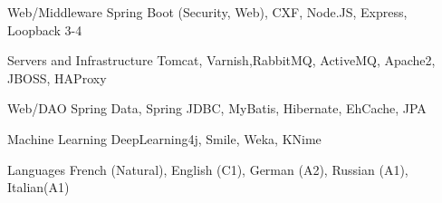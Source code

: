 \begin{cvskills}
  \cvskill
  {Web/Middleware} %
  {Spring Boot (Security, Web), CXF, Node.JS, Express, Loopback 3-4} %

  \cvskill
  {Servers and Infrastructure} %
  {Tomcat, Varnish,RabbitMQ, ActiveMQ, Apache2, JBOSS, HAProxy} %

  
  \cvskill
  {Web/DAO} %
  {Spring Data, Spring JDBC, MyBatis, Hibernate, EhCache, JPA} %

  \cvskill
  {Machine Learning} %
  {DeepLearning4j, Smile, Weka, KNime} %
  

  \cvskill
  {Languages} %
  {French (Natural), English (C1), German (A2), Russian (A1), Italian(A1)} %

\end{cvskills}
